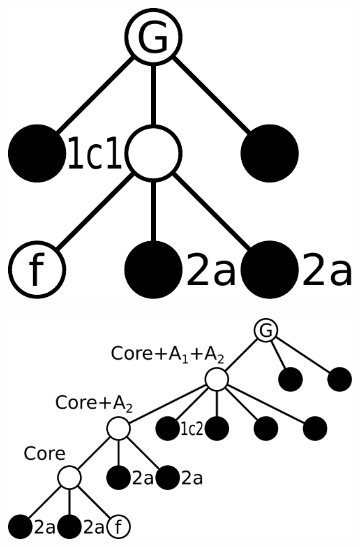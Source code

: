 \begin{figure}
\begin{subfigure}{0.24\linewidth}
        \caption{}\label{fig:seq_proof:b}
    \end{subfigure}%
    \begin{subfigure}{0.240\linewidth}\centering
        \includegraphics[height=\myMinHeight]{../../img/svg/seq_proof_figs_c}
        \caption{}\label{fig:seq_proof:c}
    \end{subfigure}%
    \hfill
    \begin{subfigure}{0.24\linewidth}\centering
        \includegraphics[height=\myMinHeight]{../../img/svg/seq_proof_figs_d}
        \caption{}\label{fig:seq_proof:d}
    \end{subfigure}%


\end{figure}
